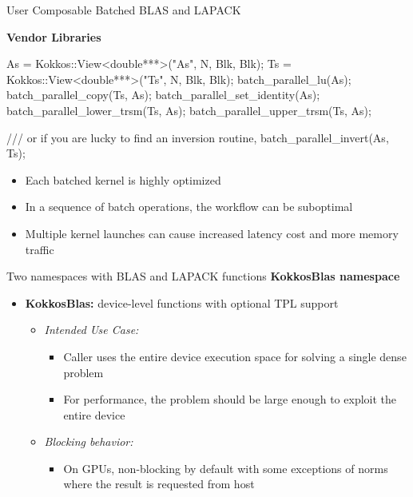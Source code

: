 \begin{frame}[fragile]{User Composable Batched BLAS and LAPACK}

  \textbf{Vendor Libraries} \\
  \vspace{10pt}
    \begin{code}[keywords={}]
      As = Kokkos::View<double***>("As", N, Blk, Blk);
      Ts = Kokkos::View<double***>("Ts", N, Blk, Blk);
      batch_parallel_lu(As);
      batch_parallel_copy(Ts, As);
      batch_parallel_set_identity(As);
      batch_parallel_lower_trsm(Ts, As);
      batch_parallel_upper_trsm(Ts, As);
      
      /// or if you are lucky to find an inversion routine,
      batch_parallel_invert(As, Ts);
    \end{code}
    \begin{itemize}
      \item \small{Each batched kernel is highly optimized}
      \item \small{In a sequence of batch operations, the workflow can be suboptimal}
      \item \small{Multiple kernel launches can cause increased latency cost and more memory traffic}
    \end{itemize}
\end{frame}

\begin{frame}[fragile]{Two namespaces with BLAS and LAPACK functions}
  \textbf{KokkosBlas namespace} \\
  \vspace{10pt}
  \begin{itemize}
    \item \textbf{KokkosBlas:} device-level functions with optional TPL support
    \begin{itemize}
      \item \textit{Intended Use Case:}
      \begin{itemize}
        \item Caller uses the entire device execution space for solving a single dense problem
        \item For performance, the problem should be large enough to exploit the entire device
      \end{itemize}
      \item \textit{Blocking behavior:}
      \begin{itemize}
        \item On GPUs, non-blocking by default with some exceptions of norms
        where the result is requested from host
      \end{itemize}
    \end{itemize}
  \end{itemize}
\end{frame}

